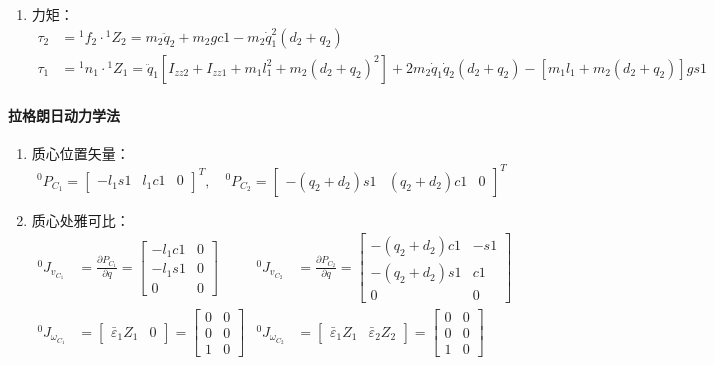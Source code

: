 \documentclass[
12pt, %
a4paper, 
oneside, %
]{scrartcl}
\begin{document}
{\begin{enumerate}
\begin{align*}
\end{align*}
\item 力矩：
\begin{align*}
\tau_2 &= {}^1 f_2 \cdot {}^1 Z_2 = m_2 \ddot{q}_2 + m_2 gc1 - m_2 \dot{q}_1^2 (d_2 + q_2) \\
\tau_1 &= {}^1 n_1 \cdot {}^1 Z_1 = \ddot{q}_1[I_{zz2} + I_{zz1} + m_1 l_1^2 + m_2(d_2 + q_2)^2] + 2m_2 \dot{q}_1 \dot{q}_2(d_2 + q_2) - [m_1 l_1 + m_2(d_2 + q_2)]gs1
\end{align*}
\end{enumerate}
\paragraph{拉格朗日动力学法}
\begin{enumerate}
\item 质心位置矢量：
$$ {}^0 P_{C_1} = \begin{bmatrix} -l_1 s1 & l_1 c1 & 0 \end{bmatrix}^T, \quad {}^0 P_{C_2} = \begin{bmatrix} -(q_2 + d_2)s1 & (q_2 + d_2)c1 & 0 \end{bmatrix}^T $$
\item 质心处雅可比：
\begin{align*}
{}^0 J_{v_{C_1}} &= \frac{\partial P_{C_1}}{\partial q} = \begin{bmatrix} -l_1 c1 & 0 \\ -l_1 s1 & 0 \\ 0 & 0 \end{bmatrix} & {}^0 J_{v_{C_2}} &= \frac{\partial P_{C_2}}{\partial q} = \begin{bmatrix} -(q_2 + d_2)c1 & -s1 \\ -(q_2 + d_2)s1 & c1 \\ 0 & 0 \end{bmatrix} \\
{}^0 J_{\omega_{C_1}} &= \begin{bmatrix} \bar{\varepsilon}_1 Z_1 & 0 \end{bmatrix} = \begin{bmatrix} 0 & 0 \\ 0 & 0 \\ 1 & 0 \end{bmatrix} & {}^0 J_{\omega_{C_2}} &= \begin{bmatrix} \bar{\varepsilon}_1 Z_1 & \bar{\varepsilon}_2 Z_2 \end{bmatrix} = \begin{bmatrix} 0 & 0 \\ 0 & 0 \\ 1 & 0 \end{bmatrix}

\end{align*}
\end{enumerate}}
\end{document}
